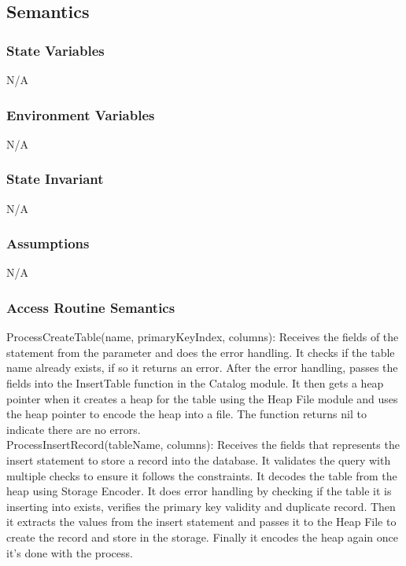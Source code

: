 \documentclass[12pt]{article}
\begin{document}
\subsection {Semantics}

\subsubsection {State Variables}

N/A

\subsubsection {Environment Variables}
N/A

\subsubsection {State Invariant}
N/A

\subsubsection {Assumptions}
N/A


\subsubsection {Access Routine Semantics}

\noindent ProcessCreateTable(name, primaryKeyIndex, columns): Receives the fields of the statement from the parameter and does the error handling. It checks if the table name already exists, if so it returns an error. After the error handling, passes the fields into the InsertTable function in the Catalog module. It then gets a heap pointer when it creates a heap for the table using the Heap File module and uses the heap pointer to encode the heap into a file. The function returns nil to indicate there are no errors. \\

\noindent ProcessInsertRecord(tableName, columns): Receives the fields that represents the insert statement to store a record into the database. It validates the query with multiple checks to ensure it follows the constraints. It decodes the table from the heap using Storage Encoder. It does error handling by checking if the table it is inserting into exists, verifies the primary key validity and duplicate record. Then it extracts the values from the insert statement and passes it to the Heap File to create the record and store in the storage. Finally it encodes the heap again once it's done with the process. \\
\end{document}
